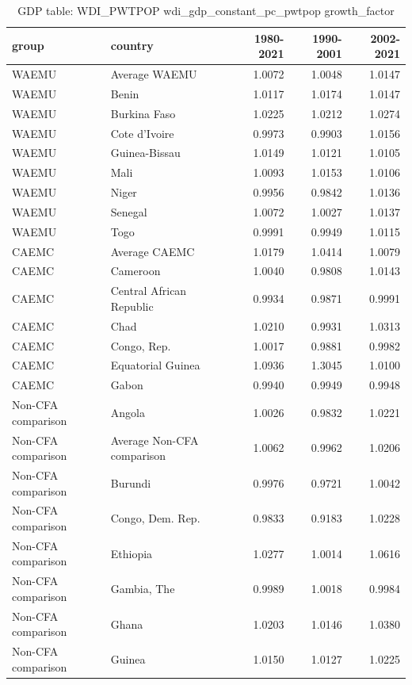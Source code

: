 \begin{table}

\caption{GDP table: WDI_PWTPOP wdi_gdp_constant_pc_pwtpop growth_factor}
\centering
\begin{tabular}[t]{llrrr}
\toprule
group & country & 1980-2021 & 1990-2001 & 2002-2021\\
\midrule
WAEMU & Average WAEMU & 1.0072 & 1.0048 & 1.0147\\
WAEMU & Benin & 1.0117 & 1.0174 & 1.0147\\
WAEMU & Burkina Faso & 1.0225 & 1.0212 & 1.0274\\
WAEMU & Cote d'Ivoire & 0.9973 & 0.9903 & 1.0156\\
WAEMU & Guinea-Bissau & 1.0149 & 1.0121 & 1.0105\\
\addlinespace
WAEMU & Mali & 1.0093 & 1.0153 & 1.0106\\
WAEMU & Niger & 0.9956 & 0.9842 & 1.0136\\
WAEMU & Senegal & 1.0072 & 1.0027 & 1.0137\\
WAEMU & Togo & 0.9991 & 0.9949 & 1.0115\\
CAEMC & Average CAEMC & 1.0179 & 1.0414 & 1.0079\\
\addlinespace
CAEMC & Cameroon & 1.0040 & 0.9808 & 1.0143\\
CAEMC & Central African Republic & 0.9934 & 0.9871 & 0.9991\\
CAEMC & Chad & 1.0210 & 0.9931 & 1.0313\\
CAEMC & Congo, Rep. & 1.0017 & 0.9881 & 0.9982\\
CAEMC & Equatorial Guinea & 1.0936 & 1.3045 & 1.0100\\
\addlinespace
CAEMC & Gabon & 0.9940 & 0.9949 & 0.9948\\
Non-CFA comparison & Angola & 1.0026 & 0.9832 & 1.0221\\
Non-CFA comparison & Average Non-CFA comparison & 1.0062 & 0.9962 & 1.0206\\
Non-CFA comparison & Burundi & 0.9976 & 0.9721 & 1.0042\\
Non-CFA comparison & Congo, Dem. Rep. & 0.9833 & 0.9183 & 1.0228\\
\addlinespace
Non-CFA comparison & Ethiopia & 1.0277 & 1.0014 & 1.0616\\
Non-CFA comparison & Gambia, The & 0.9989 & 1.0018 & 0.9984\\
Non-CFA comparison & Ghana & 1.0203 & 1.0146 & 1.0380\\
Non-CFA comparison & Guinea & 1.0150 & 1.0127 & 1.0225\\

\end{tabular}
\end{table}
